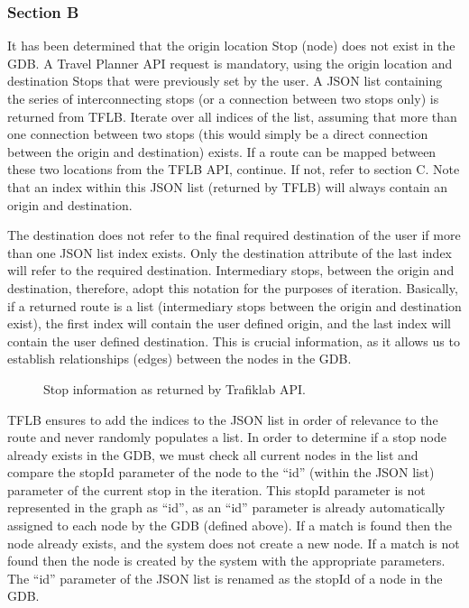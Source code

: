 \documentclass[12pt]{article}   	%
\begin{document}
\subsubsection{Section B}
It has been determined that the origin location Stop (node) does not exist in the GDB. A Travel Planner API request is mandatory, using the origin location and destination Stops that were previously set by the user. A JSON list containing the series of interconnecting stops (or a connection between two stops only) is returned from TFLB. Iterate over all indices of the list, assuming that more than one connection between two stops (this would simply be a direct connection between the origin and destination) exists. If a route can be mapped between these two locations from the TFLB API, continue. If not, refer to section C. Note that an index within this JSON list (returned by TFLB) will always contain an origin and destination.

The destination does not refer to the final required destination of the user if more than one JSON list index exists. Only the destination attribute of the last index will refer to the required destination. Intermediary stops, between the origin and destination, therefore, adopt this notation for the purposes of iteration. Basically, if a returned route is a list (intermediary stops between the origin and destination exist), the first index will contain the user defined origin, and the last index will contain the user defined destination. This is crucial information, as it allows us to establish relationships (edges) between the nodes in the GDB.

\noindent
\hfill
\begin{figure}[htp]

\caption{Stop information as returned by Trafiklab API.}
\end{figure}
\hfill

\noindent
TFLB ensures to add the indices to the JSON list in order of relevance to the route and never randomly populates a list. In order to determine if a stop node already exists in the GDB, we must check all current nodes in the list and compare the stopId parameter of the node to the “id” (within the JSON list) parameter of the current stop in the iteration. This stopId parameter is not represented in the graph as “id”, as an “id” parameter is already automatically assigned to each node by the GDB (defined above). If a match is found then the node already exists, and the system does not create a new node. If a match is not found then the node is created by the system with the appropriate parameters. The “id” parameter of the JSON list is renamed as the stopId of a node in the GDB.
\end{document}
